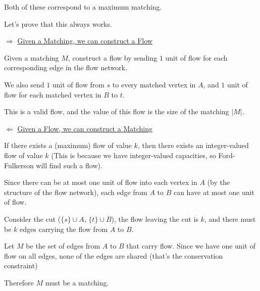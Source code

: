 \documentclass[12pt]{article}
\begin{document}
{    \begin{center}
    \end{center}

    Both of these correspond to a maximum matching.
  }

  Let's prove that this always works.

  {
    $\Rightarrow$ \underline{Given a Matching, we can construct a Flow}

    Given a matching $M$, construct a flow by sending $1$ unit of flow for
    each corresponding edge in the flow network.

    We also send $1$ unit of flow from $s$ to every matched vertex in $A$, and
    $1$ unit of flow for each matched vertex in $B$ to $t$.

    This is a valid flow, and the value of this flow is the size of the
    matching $|M|$.

    $\Leftarrow$ \underline{Given a Flow, we can construct a Matching}

    If there exists a (maximum) flow of value $k$, then there exists an
    integer-valued flow of value $k$ (This is because we have integer-valued
    capacities, so Ford-Fulkerson will find such a flow).

    Since there can be at most one unit of flow into each vertex in $A$ (by
    the structure of the flow network), each edge from $A$ to $B$ can have at
    most one unit of flow.

    Consider the cut ($\{s\} \cup A$, $\{t\} \cup B$), the flow leaving the
    cut is $k$, and there must be $k$ edges carrying the flow from $A$ to $B$.

    Let $M$ be the set of edges from $A$ to $B$ that carry flow. Since we have
    one unit of flow on all edges, none of the edges are shared (that's the
    conservation constraint)

    Therefore $M$ must be a matching.
  }
\end{document}
